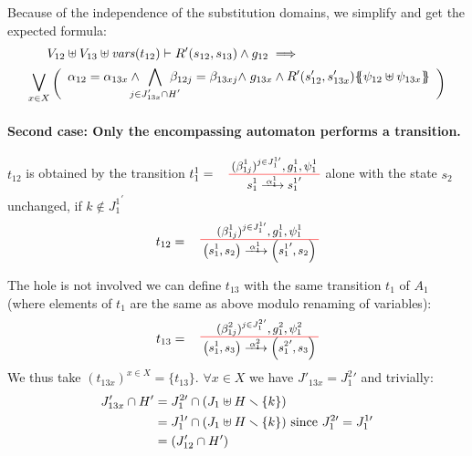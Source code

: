 \documentclass[runningheads]{llncs}
\begin{document}
\begin{enumerate}
Because of the independence of the substitution domains, we simplify and get the expected formula:
\begin{multline*}
V_{12} \uplus V_{13}  \uplus \fvars{t_{12}} \vdash
R'\mpar{s_{12}, s_{13}} \wedge g_{12} 
\implies \hspace{10em}\\ \operatorname*{\bigsymb{\bigvee}}_{x \in X} \mpar{\everymath{\displaystyle}
\begin{array}{l}
			\alpha_{12} = \alpha_{13x} \wedge \bigwedge_\subbox{j \in J'_{13x} \cap H'} \beta_{12j} = \beta_{13xj} \nwedge g_{13x} \wedge 
			 R'\mpar{s'_{12}, s'_{13x}}\psubst{\psi_{12} \uplus \psi_{13x}}
		\end{array}}   
\end{multline*}	

\paragraph{Second case: Only the encompassing automaton performs a transition.}
  $t_{12}$ is obtained by the transition 
$t^1_1=\OT{ s^1_1}{{s^1_1}'}{\alpha_1^1}{{(\beta^1_{1j})^{j \in J^{1 \prime}_1} }}{ g^1_1 }{ \psi^1_1}$  alone with the state $s_2$ unchanged, if $k \not\in {J^1_{1}}^{\prime}$
\[t_{12} = \OT{\mpar{s^1_1, s_2}}{\mpar{{s^1_1}', s_2}}{\alpha_1^1}{ {(\beta^1_{1j})^{j \in J^{1 \prime}_1} }}{g^1_1}{\psi^1_1}
\]
 

The hole is not involved we can define $t_{13}$ with the same transition $t_1$ of $A_1$ (where elements of $t_1$ are the same as above modulo renaming of variables):
\[t_{13} = \OT{\mpar{s^1_1, s_3}}{\mpar{{s^2_1}', s_3}}{\alpha_1^2}{ {(\beta^2_{1j})^{j \in {J^{2}_1}'} }}{g^2_1}{\psi^2_1}
\]
We thus take $({t_{13 x}})^{x\in X} = \{t_{13}\}$.
$\forall x \in X$ we have $J'_{13x} =  {J^{2}_1}'$ and trivially:
\begin{align*}		
J'_{13x} \cap H' & =  J^{2 \prime}_1 \cap {\left(J_1 \uplus H \smallsetminus{\left\{k\right\}}\right)} \\
& =  J^{1 \prime}_1 \cap {\left(J_1 \uplus H \smallsetminus{\left\{k\right\}}\right)} \text{ since }  J^{2 \prime}_1 =  J^{1 \prime}_1\\
& = {\left(J'_{12}\cap H' \right)}
\end{align*}




\end{enumerate}
\end{document}
